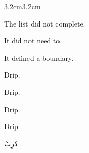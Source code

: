 \begin{adjustwidth}{3.2cm}{3.2cm}

The list did not complete.

\medskip

It did not need to.

\medskip

It defined a boundary.

\vspace{3em}

Drip.

\vspace{2em}

Drip.

\vspace{2em}

Drip.

\vspace{3em}

\end{adjustwidth}


\begin{center}

Drip

\medskip


\medskip

\begin{AR}
دْرِبْ
\end{AR}

\medskip


\medskip


\medskip


\medskip


\medskip

\end{center}

\vspace{3em}

